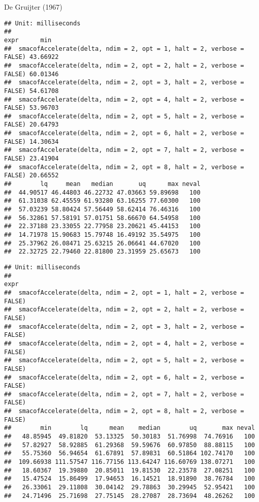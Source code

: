 \documentclass[
  12pt,
]{article}
\begin{document}
De Gruijter (1967)

\begin{verbatim}
## Unit: milliseconds
##                                                                   expr      min
##  smacofAccelerate(delta, ndim = 2, opt = 1, halt = 2, verbose = FALSE) 43.66922
##  smacofAccelerate(delta, ndim = 2, opt = 2, halt = 2, verbose = FALSE) 60.01346
##  smacofAccelerate(delta, ndim = 2, opt = 3, halt = 2, verbose = FALSE) 54.61708
##  smacofAccelerate(delta, ndim = 2, opt = 4, halt = 2, verbose = FALSE) 53.96703
##  smacofAccelerate(delta, ndim = 2, opt = 5, halt = 2, verbose = FALSE) 20.64793
##  smacofAccelerate(delta, ndim = 2, opt = 6, halt = 2, verbose = FALSE) 14.30634
##  smacofAccelerate(delta, ndim = 2, opt = 7, halt = 2, verbose = FALSE) 23.41904
##  smacofAccelerate(delta, ndim = 2, opt = 8, halt = 2, verbose = FALSE) 20.66552
##        lq     mean   median       uq      max neval
##  44.90517 46.44803 46.22732 47.03663 59.89698   100
##  61.31038 62.45559 61.93280 63.16255 77.60300   100
##  57.03239 58.80424 57.56449 58.62414 76.46316   100
##  56.32861 57.58191 57.01751 58.66670 64.54958   100
##  22.37188 23.33055 22.77958 23.20621 45.44153   100
##  14.71978 15.90683 15.79748 16.49192 35.54975   100
##  25.37962 26.08471 25.63215 26.06641 44.67020   100
##  22.32725 22.79460 22.81800 23.31959 25.65673   100
\end{verbatim}

\begin{verbatim}
## Unit: milliseconds
##                                                                   expr
##  smacofAccelerate(delta, ndim = 2, opt = 1, halt = 2, verbose = FALSE)
##  smacofAccelerate(delta, ndim = 2, opt = 2, halt = 2, verbose = FALSE)
##  smacofAccelerate(delta, ndim = 2, opt = 3, halt = 2, verbose = FALSE)
##  smacofAccelerate(delta, ndim = 2, opt = 4, halt = 2, verbose = FALSE)
##  smacofAccelerate(delta, ndim = 2, opt = 5, halt = 2, verbose = FALSE)
##  smacofAccelerate(delta, ndim = 2, opt = 6, halt = 2, verbose = FALSE)
##  smacofAccelerate(delta, ndim = 2, opt = 7, halt = 2, verbose = FALSE)
##  smacofAccelerate(delta, ndim = 2, opt = 8, halt = 2, verbose = FALSE)
##        min        lq      mean    median        uq       max neval
##   48.85945  49.81820  53.13325  50.30183  51.76998  74.76916   100
##   57.82927  58.92885  61.29368  59.59676  60.97850  88.88115   100
##   55.75360  56.94654  61.67891  57.89831  60.51864 102.74170   100
##  109.66938 111.57547 116.77156 113.64247 116.60769 138.07271   100
##   18.60367  19.39880  20.85011  19.81530  22.23578  27.08251   100
##   15.47524  15.86499  17.94653  16.14521  18.91890  38.76784   100
##   26.33061  29.11808  30.04142  29.78863  30.29945  52.95421   100
##   24.71496  25.71698  27.75145  28.27087  28.73694  48.26262   100
\end{verbatim}
\end{document}
